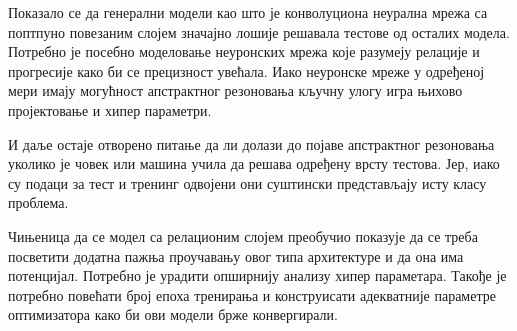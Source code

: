 \documentclass[a4paper, 12pt, master, utf8]{etf}
\begin{document}
Показало се да генерални модели као што је конволуциона неурална мрежа са поптпуно повезаним слојем значајно лошије решавала тестове од осталих модела. Потребно је посебно моделовање неуронских мрежа које разумеју релације и прогресије 
како би се прецизност увећала. Иако неуронске мреже у одређеној мери имају могућност апстрактног резоновања кључну улогу игра њихово пројектовање и хипер параметри.
\newline

И даље остаје отворено питање да ли долази до појаве апстрактног резоновања уколико је човек или машина учила да решава одређену врсту тестова. Јер, иако су подаци за тест и тренинг одвојени они суштински представљају исту класу проблема.
\newline

Чињеница да се модел са релационим слојем преобучио показује да се треба посветити додатна пажња проучавању овог типа архитектуре и да она има потенцијал. Потребно је урадити опширнију анализу хипер параметара. Такође је потребно
повећати број епоха тренирања и конструисати адекватније параметре оптимизатора како би ови модели брже конвергирали.





\end{document}
